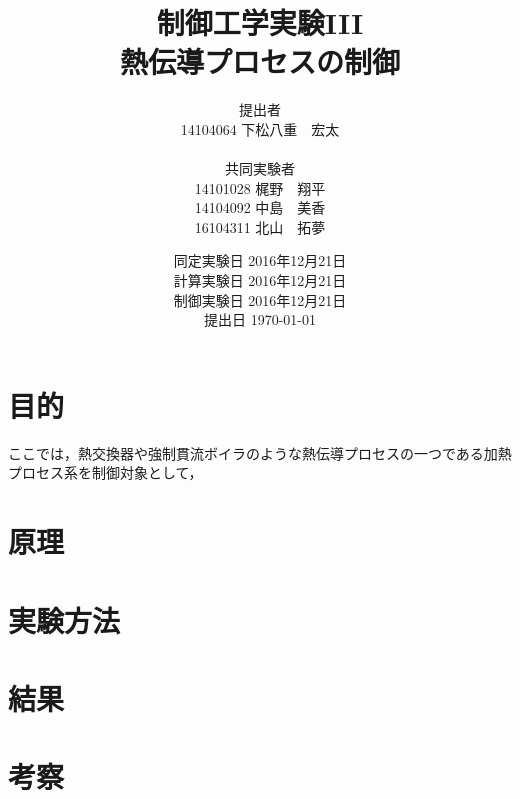 \documentclass[11pt,a4paper]{jsarticle}
\begin{document}
\title{制御工学実験I\hspace{-0.1mm}I\hspace{-0.1mm}I \\ 熱伝導プロセスの制御}
\author{提出者 \\ 14104064 下松八重　宏太 \\ \\ 共同実験者 \\ 14101028 梶野　翔平 \\ 14104092 中島　美香 \\ 16104311 北山　拓夢}
\date{同定実験日 2016年12月21日 \\ 計算実験日 2016年12月21日 \\ 制御実験日 2016年12月21日 \\ 提出日 \today}



\maketitle
\thispagestyle{empty}
\newpage


\section{目的}
ここでは，熱交換器や強制貫流ボイラのような熱伝導プロセスの一つである加熱プロセス系を制御対象として，

\section{原理}
\section{実験方法}
\section{結果}
\section{考察}
\end{document}
